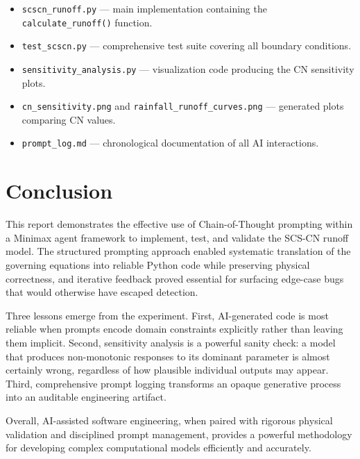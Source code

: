 \documentclass[12pt, a4paper]{article}
\begin{document}
\begin{itemize}[leftmargin=1.8em]
  \item \texttt{scscn\_runoff.py} --- main implementation containing the \texttt{calculate\_runoff()} function.
  \item \texttt{test\_scscn.py} --- comprehensive test suite covering all boundary conditions.
  \item \texttt{sensitivity\_analysis.py} --- visualization code producing the CN sensitivity plots.
  \item \texttt{cn\_sensitivity.png} and \texttt{rainfall\_runoff\_curves.png} --- generated plots comparing CN values.
  \item \texttt{prompt\_log.md} --- chronological documentation of all AI interactions.
\end{itemize}

\section{Conclusion}

This report demonstrates the effective use of Chain-of-Thought prompting within a Minimax agent framework to implement, test, and validate the SCS-CN runoff model. The structured prompting approach enabled systematic translation of the governing equations into reliable Python code while preserving physical correctness, and iterative feedback proved essential for surfacing edge-case bugs that would otherwise have escaped detection.

Three lessons emerge from the experiment. First, AI-generated code is most reliable when prompts encode domain constraints explicitly rather than leaving them implicit. Second, sensitivity analysis is a powerful sanity check: a model that produces non-monotonic responses to its dominant parameter is almost certainly wrong, regardless of how plausible individual outputs may appear. Third, comprehensive prompt logging transforms an opaque generative process into an auditable engineering artifact.

Overall, AI-assisted software engineering, when paired with rigorous physical validation and disciplined prompt management, provides a powerful methodology for developing complex computational models efficiently and accurately.

\end{document}
